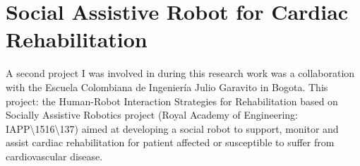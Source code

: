 

\cleartooddpage
\chapter{Social Assistive Robot for Cardiac Rehabilitation} \label{app:Colombia}

A  second project I was involved in during this research work was a collaboration with the Escuela Colombiana de Ingeniería Julio Garavito in Bogota. This project:  the Human-Robot Interaction Strategies for Rehabilitation based on Socially Assistive Robotics project (Royal Academy of Engineering: IAPP\textbackslash1516\textbackslash137) aimed at developing a social robot to support, monitor and assist cardiac rehabilitation for patient affected or susceptible to suffer from cardiovascular disease.

